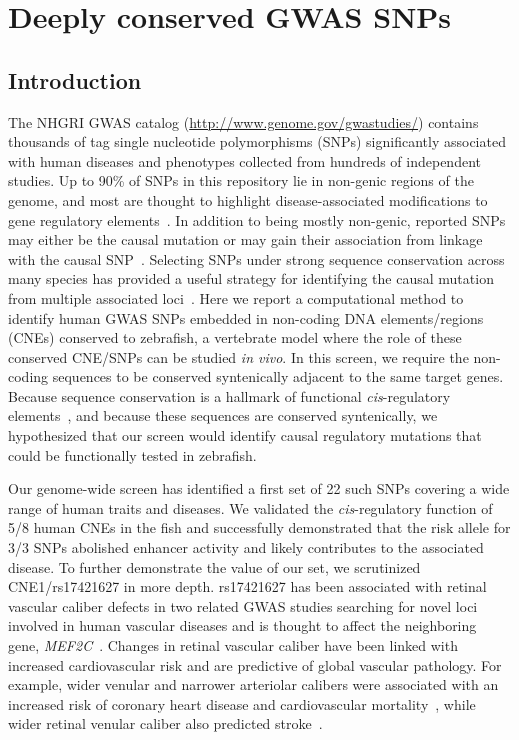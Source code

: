 \chapter{Deeply conserved GWAS SNPs}
\label{chap:zfishSnps}

\section{Introduction}

The NHGRI GWAS catalog (\url{http://www.genome.gov/gwastudies/}) contains
thousands of tag single nucleotide polymorphisms (SNPs) significantly
associated with human diseases and phenotypes collected from hundreds of
independent studies. Up to 90\% of SNPs in this repository lie in
non-genic regions of the genome, and most are thought to highlight
disease-associated modifications to gene regulatory elements~\citep{Hindorff:2009cc}. In addition to
being mostly non-genic, reported SNPs may either be the causal mutation
or may gain their association from linkage with the causal SNP~\citep{Tuupanen:2009dk, Nicolae:2010fk}. Selecting SNPs
under strong sequence conservation across many species has provided a
useful strategy for identifying the causal mutation from multiple
associated loci~\citep{Spieler:2014ky}.
Here we report a computational method to identify human GWAS SNPs
embedded in non-coding DNA elements/regions (CNEs) conserved to
zebrafish, a vertebrate model where the role of these conserved CNE/SNPs
can be studied \emph{in vivo}. In this screen, we require the non-coding
sequences to be conserved syntenically adjacent to the same target
genes. Because sequence conservation is a hallmark of functional
\emph{cis}-regulatory elements~\citep{Hiller:2013hr}, and because these sequences are conserved syntenically, we
hypothesized that our screen would identify causal regulatory mutations
that could be functionally tested in zebrafish.

Our genome-wide screen has identified a first set of 22 such SNPs
covering a wide range of human traits and diseases. We validated the
\emph{cis}-regulatory function of 5/8 human CNEs in the fish and
successfully demonstrated that the risk allele for 3/3 SNPs abolished
enhancer activity and likely contributes to the associated disease. To
further demonstrate the value of our set, we scrutinized CNE1/rs17421627
in more depth. rs17421627 has been associated with retinal vascular
caliber defects in two related GWAS studies searching for novel loci
involved in human vascular diseases and is thought to affect the neighboring
gene, \emph{MEF2C}~\citep{Ikram:2010gv, Sim:2013fm}. Changes in retinal
vascular caliber have been linked with increased cardiovascular risk and
are predictive of global vascular pathology. For example, wider venular
and narrower arteriolar calibers were associated with an increased risk
of coronary heart disease and cardiovascular mortality~\citep{Wang:2007da, McGeechan:2009wc}, while wider
retinal venular caliber also predicted stroke~\citep{McGeechan:2009dr}.

